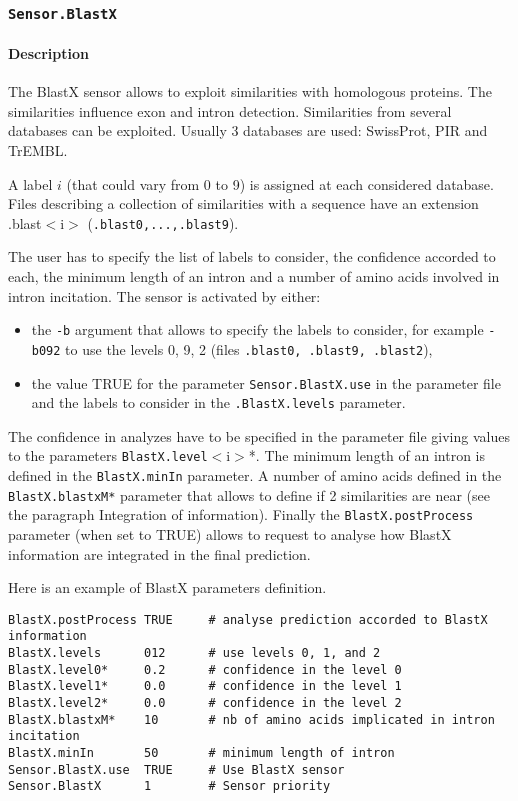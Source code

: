 
\subsubsection{\texttt{Sensor.BlastX}}

\paragraph{Description}

The BlastX sensor allows to exploit similarities with homologous
proteins. The similarities influence exon and intron detection.
Similarities from several databases can be exploited. Usually 3
databases are used: SwissProt, PIR and TrEMBL.

A label $i$ (that could vary from 0 to 9) is assigned at each
considered database. Files describing a collection of similarities with
a sequence have an extension .blast$<$i$>$ (\texttt{.blast0,...,.blast9}).

The user has to specify the list of labels to consider, the
confidence accorded to each, the minimum length of an intron and a
number of amino acids involved in intron incitation.  The sensor is
activated by either:
\begin{itemize}
\item the \texttt{-b} argument 
  that allows to specify the labels to consider, for example
  \texttt{-b092} to use the levels 0, 9, 2 (files \texttt{.blast0,
    .blast9, .blast2}),
\item the value TRUE for the parameter \texttt{Sensor.BlastX.use} in
  the parameter file and the labels to consider in the
  \texttt{.BlastX.levels} parameter.
\end{itemize}
The confidence in analyzes have to be specified in the parameter file
giving values to the parameters \texttt{BlastX.level}$<$i$>$*.  The
minimum length of an intron is defined in the \texttt{BlastX.minIn}
parameter.  A number of amino acids defined in the
\texttt{BlastX.blastxM*} parameter that allows to define if 2
similarities are near (see the paragraph Integration of information).
Finally the \texttt{BlastX.postProcess} parameter (when set to TRUE)
allows to request to analyse how BlastX information are integrated in
the final prediction.

Here is an example of BlastX parameters definition.
\begin{Verbatim}[fontsize=\small]
BlastX.postProcess TRUE     # analyse prediction accorded to BlastX information
BlastX.levels      012      # use levels 0, 1, and 2
BlastX.level0*     0.2      # confidence in the level 0
BlastX.level1*     0.0      # confidence in the level 1
BlastX.level2*     0.0      # confidence in the level 2
BlastX.blastxM*    10       # nb of amino acids implicated in intron incitation
BlastX.minIn       50       # minimum length of intron
Sensor.BlastX.use  TRUE     # Use BlastX sensor
Sensor.BlastX      1        # Sensor priority
\end{Verbatim}

